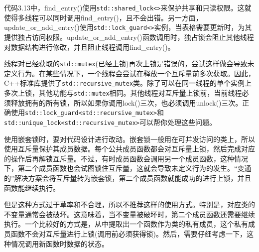 代码3.13中，find\_entry()使用\texttt{std::shared\_lock<>}来保护共享和只读权限。这就使得多线程可以同时调用find\_entry()，且不会出错。另一方面，update\_or\_add\_entry()使用\texttt{std::lock\_guard<>}实例，当表格需要更新时，为其提供独占访问权限。update\_or\_add\_entry()函数调用时，独占锁会阻止其他线程对数据结构进行修改，并且阻止线程调用find\_entry()。


线程对已经获取的\texttt{std::mutex}(已经上锁)再次上锁是错误的，尝试这样做会导致未定义行为。在某些情况下，一个线程会尝试在释放一个互斥量前多次获取。因此，C++标准库提供了\texttt{std::recursive\_mutex}类。除了可以在同一线程的单个实例上多次上锁，其他功能与\texttt{std::mutex}相同。其他线程对互斥量上锁前，当前线程必须释放拥有的所有锁，所以如果你调用lock()三次，也必须调用unlock()三次。正确使用\texttt{std::lock\_guard<std::recursive\_mutex>}和\texttt{std::unique\_lock<std::recursive\_mutex>}可以帮你处理这些问题。

使用嵌套锁时，要对代码设计进行改动。嵌套锁一般用在可并发访问的类上，所以使用互斥量保护其成员数据。每个公共成员函数都会对互斥量上锁，然后完成对应的操作后再解锁互斥量。不过，有时成员函数会调用另一个成员函数，这种情况下，第二个成员函数也会试图锁住互斥量，这就会导致未定义行为的发生。“变通的”解决方案会将互斥量转为嵌套锁，第二个成员函数就能成功的进行上锁，并且函数能继续执行。

但是这种方式过于草率和不合理，所以不推荐这样的使用方式。特别是，对应类的不变量通常会被破坏。这意味着，当不变量被破坏时，第二个成员函数还需要继续执行。一个比较好的方式是，从中提取出一个函数作为类的私有成员，这个私有成员函数不会对互斥量进行上锁(调用前必须获得锁)。然后，需要仔细考虑一下，这种情况调用新函数时数据的状态。
